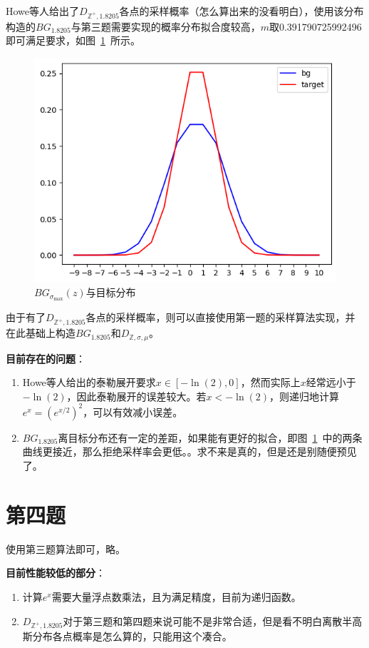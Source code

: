 \documentclass{article}
\begin{document}
    Howe等人\cite{q3}给出了$D_{\mathbb{Z}^+, 1.8205}$各点的采样概率（怎么算出来的没看明白），使用该分布构造的$BG_{1.8205}$与第三题需要实现的概率分布拟合度较高，$m$取0.391790725992496即可满足要求，如图~\ref{fig:q3}~所示。
    \begin{figure}[htb]
        \centering
        \includegraphics[width=.6\textwidth]{q3_0.5.png}
        \caption{$BG_{\sigma_{\mathrm{max}}}(z)$与目标分布}
        \label{fig:q3}
    \end{figure}

    由于有了$D_{\mathbb{Z}^+, 1.8205}$各点的采样概率，则可以直接使用第一题的采样算法实现，并在此基础上构造$BG_{1.8205}$和$D_{\mathbb{Z}, \sigma, \mu}$。

    \textbf{目前存在的问题}：
    \begin{enumerate}
        \item {}
        
        Howe等人给出的泰勒展开要求$x \in [-\ln(2), 0]$，然而实际上$x$经常远小于$-\ln(2)$，因此泰勒展开的误差较大。若$x < -\ln(2)$，则递归地计算$e^x = (e^{x/2})^2$，可以有效减小误差。

        \item $BG_{1.8205}$离目标分布还有一定的差距，如果能有更好的拟合，即图~\ref{fig:q3}~中的两条曲线更接近，那么拒绝采样率会更低。。求不来是真的，但是还是别随便预见了。
    \end{enumerate}

    \section{第四题}
    使用第三题算法即可，略。

    \textbf{目前性能较低的部分}：
    \begin{enumerate}
        \item 计算$e^x$需要大量浮点数乘法，且为满足精度，目前为递归函数。
        \item $D_{\mathbb{Z}^+, 1.8205}$对于第三题和第四题来说可能不是非常合适，但是看不明白离散半高斯分布各点概率是怎么算的，只能用这个凑合。
    \end{enumerate}
\end{document}
